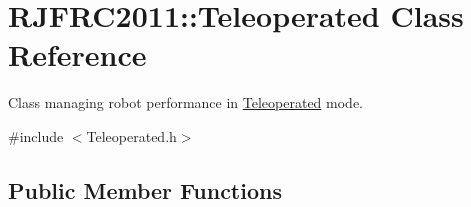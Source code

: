 \hypertarget{class_r_j_f_r_c2011_1_1_teleoperated}{
\section{RJFRC2011::Teleoperated Class Reference}
\label{class_r_j_f_r_c2011_1_1_teleoperated}
}


Class managing robot performance in \hyperlink{class_r_j_f_r_c2011_1_1_teleoperated}{Teleoperated} mode.  




{\ttfamily \#include $<$Teleoperated.h$>$}

\subsection*{Public Member Functions}
